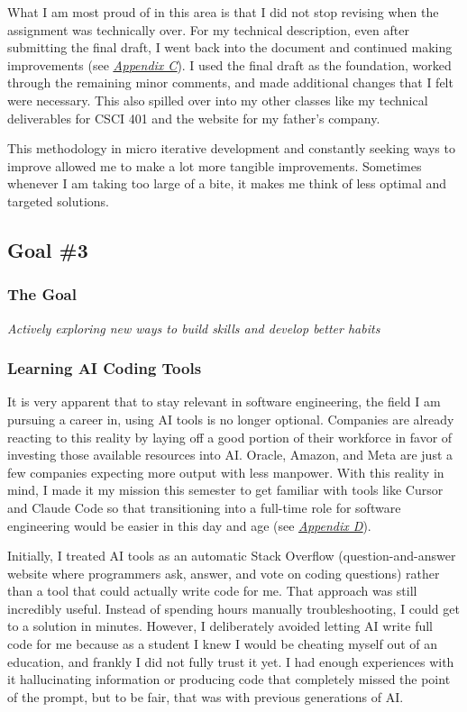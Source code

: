 \documentclass[12pt]{article}
\let\oldhyperref\hyperref
\renewcommand{\hyperref}[2][]{\oldhyperref[#1]{\textit{\uline{#2}}}}
\begin{document}
            What I am most proud of in this area is that I did not stop revising when the assignment was technically over. For my technical description, even after submitting the final draft, I went back into the document and continued making improvements (see \hyperref[appendix:c]{Appendix C}). I used the final draft as the foundation, worked through the remaining minor comments, and made additional changes that I felt were necessary. This also spilled over into my other classes like my technical deliverables for CSCI 401 and the website for my father's company.

            This methodology in micro iterative development and constantly seeking ways to improve allowed me to make a lot more tangible improvements. Sometimes whenever I am taking too large of a bite, it makes me think of less optimal and targeted solutions.

        \newpage
        \subsection{Goal \#3}

            \subsubsection*{The Goal}
            \textit{Actively exploring new ways to build skills and develop better habits}

            \subsubsection{Learning AI Coding Tools}
            \label{sec:ai-coding-tools}

            It is very apparent that to stay relevant in software engineering, the field I am pursuing a career in, using AI tools is no longer optional. Companies are already reacting to this reality by laying off a good portion of their workforce in favor of investing those available resources into AI. Oracle, Amazon, and Meta are just a few companies expecting more output with less manpower. With this reality in mind, I made it my mission this semester to get familiar with tools like Cursor and Claude Code so that transitioning into a full-time role for software engineering would be easier in this day and age (see \hyperref[appendix:d]{Appendix D}).

            Initially, I treated AI tools as an automatic Stack Overflow (question-and-answer website where programmers ask, answer, and vote on coding questions) rather than a tool that could actually write code for me. That approach was still incredibly useful. Instead of spending hours manually troubleshooting, I could get to a solution in minutes. However, I deliberately avoided letting AI write full code for me because as a student I knew I would be cheating myself out of an education, and frankly I did not fully trust it yet. I had enough experiences with it hallucinating information or producing code that completely missed the point of the prompt, but to be fair, that was with previous generations of AI.
\end{document}
